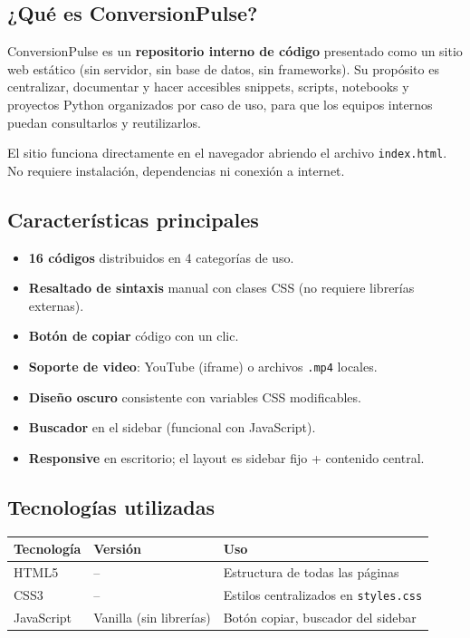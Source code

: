 \documentclass[12pt, a4paper]{article}
\newcommand{\archivo}[1]{\texttt{\textcolor{cpAccent}{#1}}}
\newcommand{\codigo}[1]{\texttt{\small #1}}
\begin{document}
\subsection{¿Qué es ConversionPulse?}

ConversionPulse es un \textbf{repositorio interno de código} presentado como un
sitio web estático (sin servidor, sin base de datos, sin frameworks). Su propósito
es centralizar, documentar y hacer accesibles snippets, scripts, notebooks y
proyectos Python organizados por caso de uso, para que los equipos internos
puedan consultarlos y reutilizarlos.

El sitio funciona directamente en el navegador abriendo el archivo
\archivo{index.html}. No requiere instalación, dependencias ni conexión a internet.

\subsection{Características principales}

\begin{itemize}[leftmargin=1.5em]
    \item \textbf{16 códigos} distribuidos en 4 categorías de uso.
    \item \textbf{Resaltado de sintaxis} manual con clases CSS (no requiere librerías externas).
    \item \textbf{Botón de copiar} código con un clic.
    \item \textbf{Soporte de video}: YouTube (iframe) o archivos \codigo{.mp4} locales.
    \item \textbf{Diseño oscuro} consistente con variables CSS modificables.
    \item \textbf{Buscador} en el sidebar (funcional con JavaScript).
    \item \textbf{Responsive} en escritorio; el layout es sidebar fijo + contenido central.
\end{itemize}

\subsection{Tecnologías utilizadas}

\begin{center}
\begin{tabular}{lll}
\toprule
\textbf{Tecnología} & \textbf{Versión} & \textbf{Uso} \\
\midrule
HTML5  & --    & Estructura de todas las páginas \\
CSS3   & --    & Estilos centralizados en \archivo{styles.css} \\
JavaScript & Vanilla (sin librerías) & Botón copiar, buscador del sidebar \\
\bottomrule
\end{tabular}
\end{center}
\end{document}
